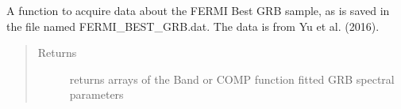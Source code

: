 \documentclass[letterpaper,10pt,english]{sphinxmanual}
\begin{document}

\begin{fulllineitems}
\label{\detokenize{read_process_files:read_process_files.get_FERMI_best_data}}
A function to acquire data about the FERMI Best GRB sample, as is saved in the file named FERMI\_BEST\_GRB.dat.
The data is from Yu et al. (2016).
\begin{quote}\begin{description}
\item[{Returns}] \leavevmode
returns arrays of the Band or COMP function fitted GRB spectral parameters

\end{description}\end{quote}

\end{fulllineitems}

\end{document}
